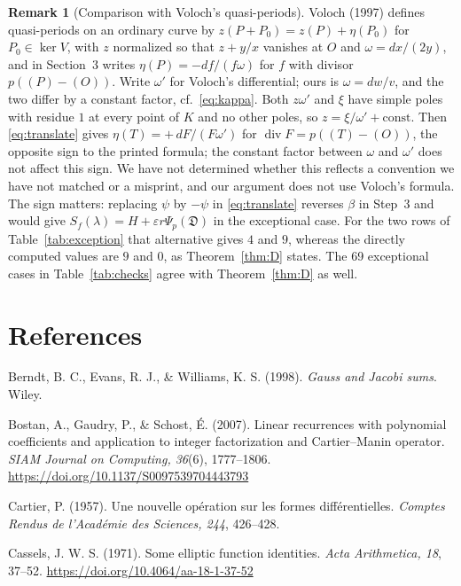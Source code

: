 \documentclass[11pt,a4paper]{article}
\numberwithin{equation}{section}
\theoremstyle{plain}
\theoremstyle{definition}
\newtheorem{remark}[theorem]{Remark}
\DeclareMathOperator{\divisor}{div}
\newcommand{\D}{\mathfrak{D}}
\newcommand{\eps}{\varepsilon}
\begin{document}
\begin{remark}[Comparison with Voloch's quasi-periods]\label{rem:voloch}
Voloch (1997) defines quasi-periods on an ordinary curve by $z(P+P_0)=z(P)+\eta(P_0)$ for $P_0\in\ker V$, with $z$ normalized so that $z+y/x$ vanishes at $O$ and $\omega=dx/(2y)$, and in Section~3 writes $\eta(P)=-df/(f\omega)$ for $f$ with divisor $p((P)-(O))$. Write $\omega'$ for Voloch's differential; ours is $\omega=dw/v$, and the two differ by a constant factor, cf.\ \eqref{eq:kappa}. Both $z\omega'$ and $\xi$ have simple poles with residue $1$ at every point of $K$ and no other poles, so $z=\xi/\omega'+\text{const}$. Then \eqref{eq:translate} gives $\eta(T)=+\,dF/(F\omega')$ for $\divisor F=p((T)-(O))$, the opposite sign to the printed formula; the constant factor between $\omega$ and $\omega'$ does not affect this sign. We have not determined whether this reflects a convention we have not matched or a misprint, and our argument does not use Voloch's formula. The sign matters: replacing $\psi$ by $-\psi$ in \eqref{eq:translate} reverses $\beta$ in Step~3 and would give $S_f(\lambda)=H+\eps r\Psi_p(\D)$ in the exceptional case. For the two rows of Table~\ref{tab:exception} that alternative gives $4$ and $9$, whereas the directly computed values are $9$ and $0$, as Theorem~\ref{thm:D} states. The 69 exceptional cases in Table~\ref{tab:checks} agree with Theorem~\ref{thm:D} as well.
\end{remark}

\section*{References}
\begingroup\small
\makeatletter\@afterindenttrue\makeatother
\setlength{\parindent}{-1.5em}
\setlength{\leftskip}{1.5em}
\setlength{\parskip}{1.5pt}

Berndt, B. C., Evans, R. J., \& Williams, K. S. (1998). \emph{Gauss and Jacobi sums}. Wiley.

Bostan, A., Gaudry, P., \& Schost, \'E. (2007). Linear recurrences with polynomial coefficients and application to integer factorization and Cartier--Manin operator. \emph{SIAM Journal on Computing, 36}(6), 1777--1806. \url{https://doi.org/10.1137/S0097539704443793}

Cartier, P. (1957). Une nouvelle op\'eration sur les formes diff\'erentielles. \emph{Comptes Rendus de l'Acad\'emie des Sciences, 244}, 426--428.

Cassels, J. W. S. (1971). Some elliptic function identities. \emph{Acta Arithmetica, 18}, 37--52. \url{https://doi.org/10.4064/aa-18-1-37-52}
\end{document}
